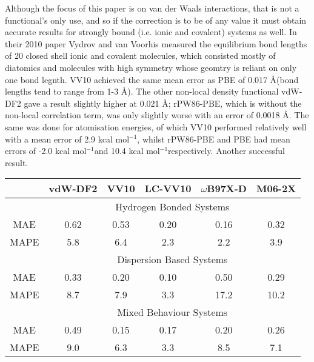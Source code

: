 \documentclass[10pt,a4paper,twocolumn,twoside]{extarticle}
\newcommand{\kcal}{kcal mol\(^{-1}\)}
\newcommand{\oA}{\si{\angstrom}}
\begin{document}
	Although the focus of this paper is on van der Waals interactions, that is not a functional's only use, and so if the correction is to be of any value it must obtain accurate results for strongly bound (i.e. ionic and covalent) systems as well. In their 2010 paper Vydrov and van Voorhis\cite{Vydrov2010} measured the equilibrium bond lengths\cite{physvals} of 20 closed shell ionic and covalent molecules, which consisted mostly of diatomics and molecules with high symmetry whose geomtry is reliant on only one bond legnth. VV10 achieved the same mean error as PBE of 0.017 \oA (bond lengths tend to range from 1-3 \oA). The other non-local density functional vdW-DF2 gave a result slightly higher at 0.021 \oA; rPW86-PBE, which is without the non-local correlation term, was only slightly worse with an error of 0.0018 \oA. The same was done for atomisation energies\cite{atomisationvals}, of which VV10 performed relatively well with a mean error of 2.9 \kcal, whilst rPW86-PBE and PBE had mean errors of -2.0 \kcal and 10.4 \kcal respectively. Another successful result. 

	\begin{figure*}
		\centering
		\label{VV10S66}
		\begin{tabular}[]{c|c c c c c}
			& vdW-DF2 & VV10 & LC-VV10 & $\omega$B97X-D & M06-2X\\
			\hline
			& \multicolumn{5}{c}{Hydrogen Bonded Systems}\\
			MAE & 0.62 & 0.53 & 0.20 & 0.16 & 0.32\\
			MAPE & 5.8 & 6.4 & 2.3 & 2.2 & 3.9\\
			& \multicolumn{5}{c}{Dispersion Based Systems}\\
			MAE & 0.33 & 0.20 & 0.10 & 0.50 & 0.29\\
			MAPE & 8.7 & 7.9 & 3.3 & 17.2 & 10.2\\
			& \multicolumn{5}{c}{Mixed Behaviour Systems}\\
			MAE & 0.49 & 0.15 & 0.17 & 0.20 & 0.26\\
			MAPE & 9.0 & 6.3 & 3.3 & 8.5 & 7.1\\
		\end{tabular}
		\caption{Errors of the binding energy at equilibrium distance for the functionals benchmarked against the S66 test set for weakly bounded systems in Ref \cite{Vydrov2012}, where MAE is the mean absolute error in \kcal and MPE is the mean absolute percentage error. }
		\label{fig:VV10S66}
	\end{figure*}
\end{document}
